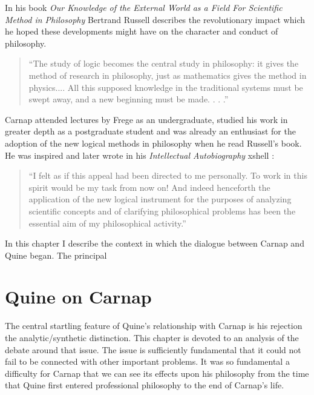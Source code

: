 In his book \emph{Our Knowledge of the External World as a Field For Scientific Method in Philosophy} \cite{russell21} Bertrand Russell describes the revolutionary impact which he hoped these developments might have on the character and conduct of philosophy.

\begin{quote}
``The study of logic becomes the central study in philosophy: it gives the method of research in philosophy, just as mathematics gives the method in physics....	
All this supposed knowledge in the traditional systems must be swept away, and a new beginning must be made. . . .''
\end{quote}

Carnap attended lectures by Frege as an undergraduate, studied his work in greater depth as a postgraduate student
and was already an enthusiast for the adoption of the new logical methods in philosophy when he read Russell's
book.
He was inspired and later wrote in his \emph{Intellectual Autobiography} xshell
\cite{carnap63}:

\begin{quotation}
``I felt as if this appeal had been directed to me personally.
To work in this spirit would be my task from now on! And indeed henceforth the application of the new logical instrument for the purposes of analyzing scientific concepts and of clarifying philosophical problems has been the essential aim of my philosophical activity.''
\end{quotation}

In this chapter I describe the context in which the dialogue between
Carnap and Quine began.
The principal


\chapter{Quine on Carnap}

\nocite{carnap56,carnap63,copi67,quine53,quine61, quine61a,quine66,quine86}

The central startling feature of Quine's relationship with
Carnap is his rejection the analytic/synthetic distinction.
This chapter is devoted to an analysis of the debate around
that issue.
The issue is sufficiently fundamental that it could not fail
to be connected with other important problems.
It was so fundamental a difficulty for Carnap that we can
see its effects upon his philosophy from the time that Quine
first entered professional philosophy to the end of Carnap's
life.

